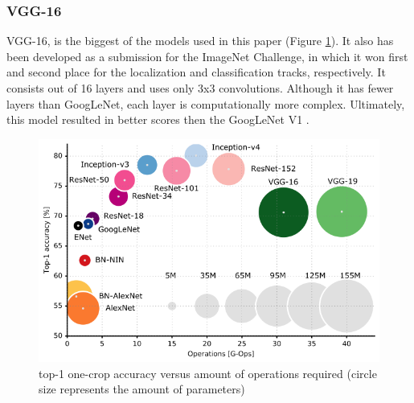 \documentclass[conference]{IEEEtran}
\begin{document}
\subsubsection{VGG-16}
VGG-16, is the biggest of the models used in this paper (Figure \ref{fig:x mode size}).
It also has been developed as a submission for the ImageNet Challenge, in which it won first and second place for the localization and classification tracks, respectively.
It consists out of 16 layers and uses only 3x3 convolutions. Although it has fewer layers than GoogLeNet, each layer is computationally more complex. Ultimately, this model resulted in better scores then the GoogLeNet V1 \cite{simonyan_very_2015}.

\begin{figure}[!htbp]
    \centering
    \includegraphics[scale=0.35]{img/model_sizes.png}
    \caption{top-1 one-crop accuracy versus amount of operations required (circle size represents the amount of parameters)}
    \label{fig:x mode size}
\end{figure}
\end{document}

